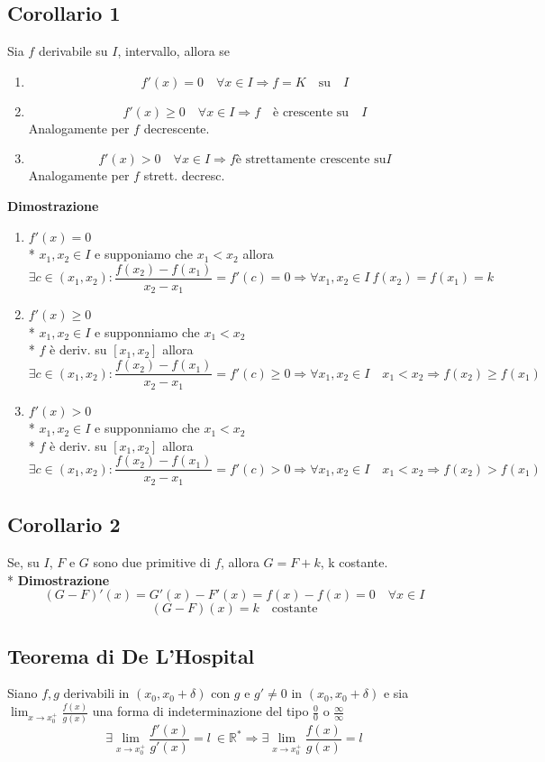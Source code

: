 \documentclass[12pt]{article}
\begin{document}
\subsection{Corollario 1}
Sia $f$ derivabile su $I$, intervallo,
allora se
\begin{enumerate}
  \item \[ f'(x) = 0 \quad \forall x \in I \Rightarrow f=K \quad \text{su} \quad I\]
  \item \[f'(x) \geq 0 \quad \forall x \in I \Rightarrow f \quad \text{è crescente su} \quad I\]
Analogamente per $f$ decrescente.
\item \[f'(x) > 0 \quad \forall x \in I
\Rightarrow f \text{è strettamente crescente su} I\]
Analogamente per $f$ strett. decresc.
\end{enumerate}
\textbf{Dimostrazione}
\begin{enumerate}
\item $f'(x)=0$\\*
$x_1, x_2 \in I$ e supponiamo che $x_1<x_2$ allora \[\exists c \in (x_1, x_2): \frac{f(x_2)-f(x_1)}{x_2-x_1} = f'(c) = 0
\Rightarrow \forall x_1, x_2 \in I\ f(x_2) = f(x_1) = k\]
\item $f'(x) \geq 0$\\*
$x_1, x_2 \in I$ e supponniamo che $x_1<x_2$\\*
$f$ è deriv. su $[x_1,x_2]$ allora
\[ \exists c \in (x_1, x_2): 
\frac{f(x_2)-f(x_1)}{x_2 - x_1} = f'(c) \geq 0 \Rightarrow \forall x_1, x_2 \in I \quad x_1<x_2 \Rightarrow f(x_2) \geq f(x_1) \]

\item $f'(x) > 0$\\*
$x_1, x_2 \in I$ e supponniamo che $x_1<x_2$\\*
$f$ è deriv. su $[x_1,x_2]$ allora
\[ \exists c \in (x_1, x_2): 
\frac{f(x_2)-f(x_1)}{x_2 - x_1} = f'(c) > 0 \Rightarrow \forall x_1, x_2 \in I \quad x_1<x_2 \Rightarrow f(x_2) > f(x_1) \]
\end{enumerate}

\subsection{Corollario 2}
Se, su $I$, $F$ e $G$ sono due primitive di $f$, allora $G = F+k$, k costante.\\*
\textbf{Dimostrazione}
\[(G-F)'(x) = G'(x) - F'(x) = f(x) - f(x) = 0 \quad \forall x \in I\]
\[ (G-F)(x) = k \quad \text{costante}\]


\subsection{Teorema di De L'Hospital}
Siano $f,g$ derivabili in $(x_0, x_0 + \delta)$
con $g$ e $g' \neq 0$ in $(x_0, x_0 + \delta)$
e sia $\displaystyle \lim_{x \to x^{+}_0} \frac{f(x)}{g(x)}$ una forma
di indeterminazione del tipo $\frac{0}{0}$ o $\frac{\infty}{\infty}$
\[
\exists \lim_{x \to x^{+}_0} \frac{f'(x)}{g'(x)} = l\ \in \mathbb{R}^{*} \Rightarrow \exists \lim_{x \to x^{+}_0} \frac{f(x)}{g(x)} = l
\]
\end{document}
